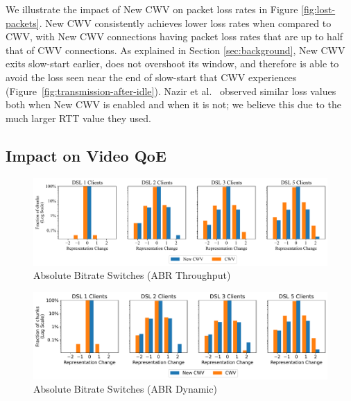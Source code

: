 \documentclass[10pt,sigconf]{acmart}
\begin{document}
We illustrate the impact of New CWV on packet loss rates in Figure \ref{fig:lost-packets}. New CWV consistently achieves lower loss rates when compared to CWV, with New CWV connections having packet loss rates that are up to half that of CWV connections. As explained in Section \ref{sec:background}, New CWV exits slow-start earlier, does not overshoot its window, and therefore is able to avoid the loss seen near the end of slow-start that CWV experiences (Figure~\ref{fig:transmission-after-idle}). Nazir et al.~\cite{Nazir-2014-performance-evaluation-congestion-window-validation-dash-newcwv} observed similar loss values both when New CWV is enabled and when it is not; we believe this due to the much larger RTT value they used.


\subsection{Impact on Video QoE}
\label{sec:QoE-impact}

\begin{figure}
  \centering
  \includegraphics[width=\textwidth, keepaspectratio]{figures/bitrate_derivative_distribution.pdf}
  \caption{Absolute Bitrate Switches (ABR Throughput)}
  \label{fig:bitrate-switches}
\end{figure}

\begin{figure}
  \centering
  \includegraphics[width=\textwidth, keepaspectratio]{figures/bitrate_derivative_distribution_dynamic.pdf}
  \caption{Absolute Bitrate Switches (ABR Dynamic)}
  \label{fig:bitrate-switches-dynamic}
\end{figure}
\end{document}
